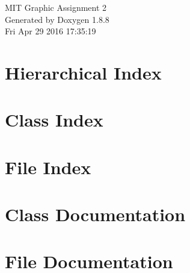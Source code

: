 \documentclass[twoside]{book}
\newcommand{\+}{\discretionary{\mbox{\scriptsize$\hookleftarrow$}}{}{}}
\newcommand{\clearemptydoublepage}{%
  \newpage{\pagestyle{empty}\cleardoublepage}%
}
\begin{document}
\hypersetup{pageanchor=false,
             bookmarks=true,
             bookmarksnumbered=true,
             pdfencoding=unicode
            }
\begin{titlepage}
\vspace*{7cm}
\begin{center}%
{\Large M\+I\+T Graphic Assignment 2 }\\
\vspace*{1cm}
{\large Generated by Doxygen 1.8.8}\\
\vspace*{0.5cm}
{\small Fri Apr 29 2016 17:35:19}\\
\end{center}
\end{titlepage}
\clearemptydoublepage
\tableofcontents
\clearemptydoublepage
{}
\hypersetup{pageanchor=true}

\chapter{Hierarchical Index}

\chapter{Class Index}

\chapter{File Index}

\chapter{Class Documentation}




















\chapter{File Documentation}





























\newpage
{}
{}
\printindex
\end{document}
